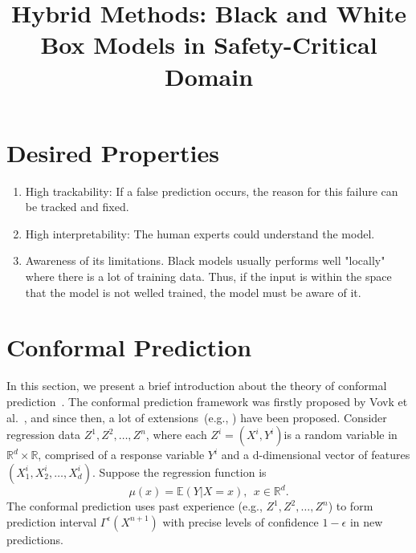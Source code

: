 \documentclass[10pt,onecolumn]{IEEEtran}
\begin{document}
     
\title{Hybrid Methods: Black and White Box Models in Safety-Critical Domain}
\maketitle

\section{Desired Properties}
\begin{enumerate}
  \item  High trackability: If a false prediction occurs, the reason  for this failure can be tracked and fixed.
  \item High interpretability: The human experts could understand the model.
  \item Awareness of its limitations.  Black models usually performs well "locally" where there is a lot of training data. Thus, if the input is within the space that the model is not welled trained, the model must be aware of it.
\end{enumerate}


\section{Conformal Prediction}
In this section, we present a brief introduction about the  theory of conformal prediction~\cite{Vovk:2005}.  The conformal prediction framework was firstly proposed by Vovk et al.~\cite{Vovk:2005,vovk2009}, and since then, a lot of extensions~(e.g., \cite{Jing2013,Jing2014}) have been proposed. Consider regression data $Z^1,Z^2,\ldots,Z^n$, where each $Z^i=(X^i,Y^i)$is a random variable in $\mathbb R^d\times \mathbb R$, comprised of a response variable $Y^i$ and a d-dimensional vector of features $(X^i_1,X^i_2,\ldots,X_d^i)$. Suppose the regression function is   $$\mu(x)=\mathbb E(Y |X =x),~~x\in \mathbb R^d.$$ The conformal prediction uses past experience (e.g., $Z^1,Z^2,\ldots, Z^n$) to form prediction interval $\Gamma^{\epsilon}(X^{n+1})$ with precise levels of confidence $1-\epsilon$ in new predictions. 
\end{document}

